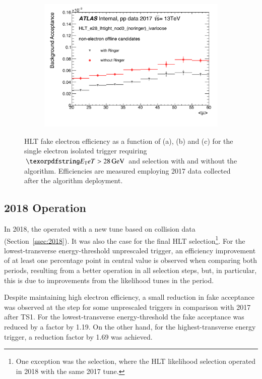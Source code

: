 \begin{figure}[h!tb]
\begin{center}
\begin{subfigure}[c]{.58\textwidth}
\centering
\includegraphics[width=\textwidth]{sections/04_operation/figures/efficiencies/eff_EGAM7_e28_ringer_and_noringer_2017_after_ts1_mu.pdf}
\caption{}
\end{subfigure}
\caption{HLT fake electron efficiency as a function of \et (a), \eta (b) and
\avgmu (c) for the single electron isolated trigger requiring $\et >
\SI{28}{\GeV}$ and \tight selection with and without the \rnn{} algorithm.
Efficiencies are measured employing 2017 data collected after the \rnn algorithm deployment.}%
\label{fig:e28_triggers_fake_hlt}
\end{center}
\end{figure}


\FloatBarrier

\subsection{2018 Operation}\label{ssec:2018_ringer_operation}

In 2018, the \rnn{} operated with a new tune based on collision data
(Section~\ref{ssec:2018}). It was also the case for the final HLT
selection\footnote{One exception was the \medium{} selection, where the HLT
likelihood selection operated in 2018 with the same 2017 tune.}. For the
lowest-transverse energy-threshold unprescaled trigger, an efficiency
improvement of at least one percentage point in central value is observed when
comparing both periods, resulting from a better operation in all selection
steps, but, in particular, this is due to improvements from the likelihood tunes in the period.

Despite maintaining high electron efficiency, a small reduction in fake acceptance was observed at the  \fastcalo{} step for some unprescaled triggers in comparison with 2017 after TS1. For the lowest-transverse energy-threshold the fake acceptance was reduced by a factor by 1.19. On the other hand, for the highest-transverse energy trigger, a reduction factor by 1.69 was achieved.


